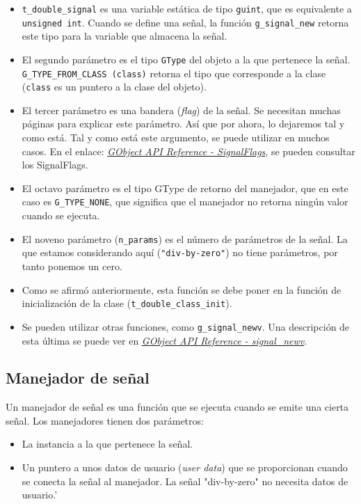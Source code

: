 \begin{itemize}
  \tightlist
\item \texttt{t\_double\_signal} es una variable estática de tipo \texttt{guint}, que es equivalente a
  \texttt{unsigned int}. Cuando se define una señal, la función \texttt{g\_signal\_new} retorna este tipo para la
  variable que almacena la señal.
\item El segundo parámetro es el tipo \texttt{GType} del objeto a la que pertenece la señal.
  \texttt{G\_TYPE\_FROM\_CLASS (class)} retorna el tipo que corresponde a la clase (\texttt{class} es un
  puntero a la clase del objeto).
\item El tercer parámetro es una bandera (\emph{flag}) de la señal. Se necesitan muchas páginas para
  explicar este parámetro. Así que por ahora, lo dejaremos tal y como está. Tal y como está este argumento,
  se puede utilizar en muchos casos. En el enlace:
  \href{https://docs.gtk.org/gobject/flags.SignalFlags.html}
  {\emph{\textsf{GObject API Reference  - SignalFlags}}},
  se pueden consultar los \textsf{SignalFlags}.
\item El octavo parámetro es el tipo \textsf{GType} de retorno del manejador, que en este caso es
  \texttt{G\_TYPE\_NONE}, que significa que el manejador no retorna ningún valor cuando se ejecuta.
\item El noveno parámetro (\texttt{n\_params}) es el número de parámetros de la señal. La que
  estamos considerando aquí (\texttt{"div-by-zero"}) no tiene parámetros, por tanto ponemos un cero.
\item Como se afirmó anteriormente, esta función se debe poner en la función de inicialización de la
  clase (\texttt{t\_double\_class\_init}).
\item Se pueden utilizar otras funciones, como \texttt{g\_signal\_newv}. Una descripción de esta
  última se puede ver en
  \href{https://docs.gtk.org/gobject/func.signal_newv.html}
  {\emph{\textsf{GObject API Reference - signal\_newv}}}.      
\end{itemize}

\subsection{Manejador de señal}
Un manejador de señal es una función que se ejecuta cuando se emite una cierta señal. Los manejadores
tienen dos parámetros:
\begin{itemize}
  \tightlist
\item La instancia a la que pertenece la señal.
\item Un puntero a unos datos de usuario (\emph{user data}) que se proporcionan cuando se conecta
  la señal al manejador. La señal \textsf{"div-by-zero"} no necesita datos de usuario.'
\end{itemize}

